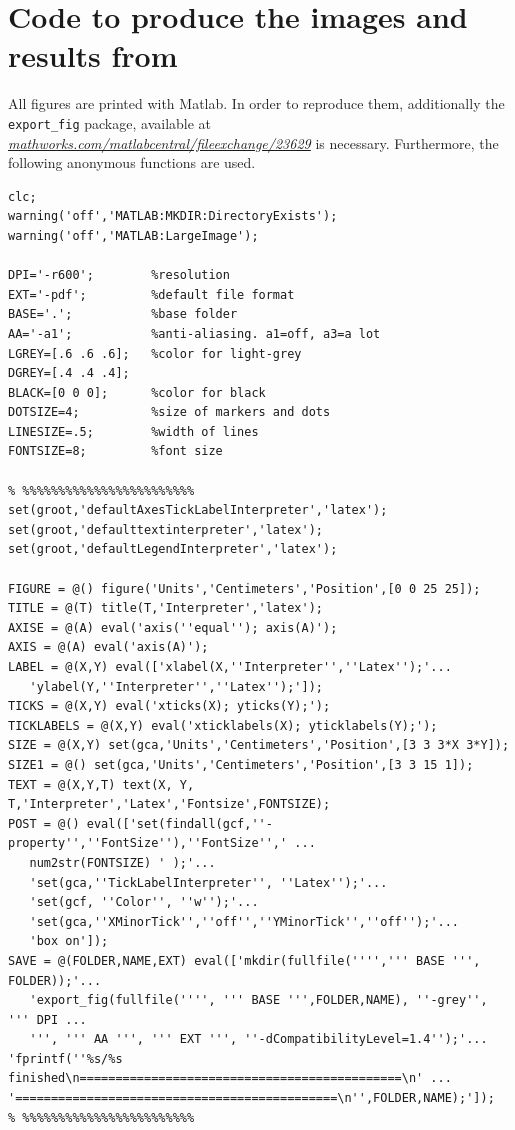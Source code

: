 
\chapter{Code to produce the images and results from~\cite{Mej20}}

All figures are printed with Matlab. In order to reproduce them, additionally the 
\verb|export_fig| package, available at \href{https://de.mathworks.com/matlabcentral/fileexchange/23629-export_fig}%
{\emph{mathworks.com/matlabcentral/fileexchange/23629}} 
is necessary.
Furthermore, the following anonymous functions are used.

{\small%
\begin{lstlisting}
clc;
warning('off','MATLAB:MKDIR:DirectoryExists');
warning('off','MATLAB:LargeImage');

DPI='-r600';        %resolution
EXT='-pdf';         %default file format
BASE='.';           %base folder
AA='-a1';           %anti-aliasing. a1=off, a3=a lot
LGREY=[.6 .6 .6];   %color for light-grey
DGREY=[.4 .4 .4];
BLACK=[0 0 0];      %color for black
DOTSIZE=4;          %size of markers and dots
LINESIZE=.5;        %width of lines
FONTSIZE=8;         %font size

% %%%%%%%%%%%%%%%%%%%%%%%%
set(groot,'defaultAxesTickLabelInterpreter','latex');  
set(groot,'defaulttextinterpreter','latex');
set(groot,'defaultLegendInterpreter','latex');

FIGURE = @() figure('Units','Centimeters','Position',[0 0 25 25]);
TITLE = @(T) title(T,'Interpreter','latex');
AXISE = @(A) eval('axis(''equal''); axis(A)');
AXIS = @(A) eval('axis(A)');
LABEL = @(X,Y) eval(['xlabel(X,''Interpreter'',''Latex'');'...
   'ylabel(Y,''Interpreter'',''Latex'');']);
TICKS = @(X,Y) eval('xticks(X); yticks(Y);');
TICKLABELS = @(X,Y) eval('xticklabels(X); yticklabels(Y);');
SIZE = @(X,Y) set(gca,'Units','Centimeters','Position',[3 3 3*X 3*Y]);
SIZE1 = @() set(gca,'Units','Centimeters','Position',[3 3 15 1]);
TEXT = @(X,Y,T) text(X, Y, T,'Interpreter','Latex','Fontsize',FONTSIZE);
POST = @() eval(['set(findall(gcf,''-property'',''FontSize''),''FontSize'',' ...
   num2str(FONTSIZE) ' );'...
   'set(gca,''TickLabelInterpreter'', ''Latex'');'...
   'set(gcf, ''Color'', ''w'');'...
   'set(gca,''XMinorTick'',''off'',''YMinorTick'',''off'');'...
   'box on']);    
SAVE = @(FOLDER,NAME,EXT) eval(['mkdir(fullfile('''',''' BASE ''', FOLDER));'...
   'export_fig(fullfile('''', ''' BASE ''',FOLDER,NAME), ''-grey'', ''' DPI ...
   ''', ''' AA ''', ''' EXT ''', ''-dCompatibilityLevel=1.4'');'...
'fprintf(''%s/%s finished\n=============================================\n' ...
'=============================================\n'',FOLDER,NAME);']);
% %%%%%%%%%%%%%%%%%%%%%%%%
\end{lstlisting}%
}

